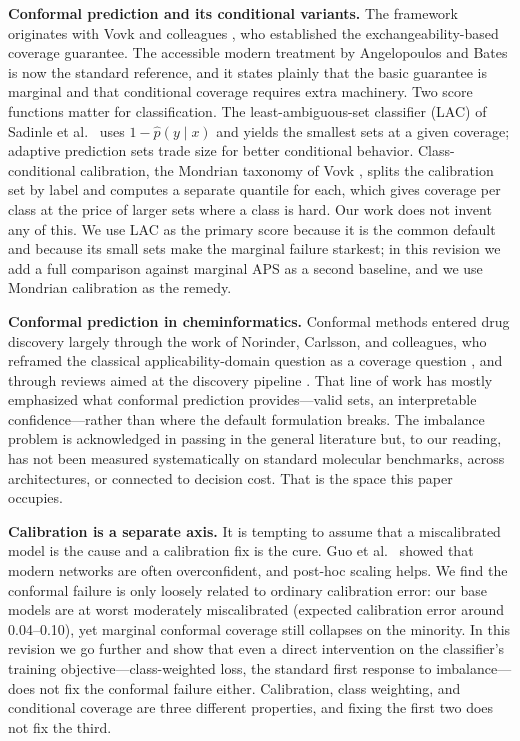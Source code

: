 \documentclass[11pt]{article}
\begin{document}
\textbf{Conformal prediction and its conditional variants.} The framework originates with Vovk and
colleagues \cite{vovk2005}, who established the exchangeability-based coverage guarantee. The
accessible modern treatment by Angelopoulos and Bates \cite{angelopoulos2023} is now the standard
reference, and it states plainly that the basic guarantee is marginal and that conditional
coverage requires extra machinery. Two score functions matter for classification. The
least-ambiguous-set classifier (LAC) of Sadinle et al.\ \cite{sadinle2019} uses $1-\hat p(y\mid x)$
and yields the smallest sets at a given coverage; adaptive prediction sets \cite{romano2020} trade
size for better conditional behavior. Class-conditional calibration, the Mondrian taxonomy of Vovk
\cite{vovk2013}, splits the calibration set by label and computes a separate quantile for each,
which gives coverage per class at the price of larger sets where a class is hard. Our work does not
invent any of this. We use LAC as the primary score because it is the common default and because
its small sets make the marginal failure starkest; in this revision we add a full comparison
against marginal APS \cite{romano2020} as a second baseline, and we use Mondrian calibration as the
remedy.

\textbf{Conformal prediction in cheminformatics.} Conformal methods entered drug discovery largely
through the work of Norinder, Carlsson, and colleagues, who reframed the classical
applicability-domain question as a coverage question \cite{norinder2014}, and through reviews
aimed at the discovery pipeline \cite{eklund2015}. That line of work has mostly emphasized what
conformal prediction provides---valid sets, an interpretable confidence---rather than where the
default formulation breaks. The imbalance problem is acknowledged in passing in the general
literature but, to our reading, has not been measured systematically on standard molecular
benchmarks, across architectures, or connected to decision cost. That is the space this paper
occupies.

\textbf{Calibration is a separate axis.} It is tempting to assume that a miscalibrated model is the
cause and a calibration fix is the cure. Guo et al.\ \cite{guo2017} showed that modern networks are
often overconfident, and post-hoc scaling helps. We find the conformal failure is only loosely
related to ordinary calibration error: our base models are at worst moderately miscalibrated
(expected calibration error around 0.04--0.10), yet marginal conformal coverage still collapses on
the minority. In this revision we go further and show that even a direct intervention on the
classifier's training objective---class-weighted loss, the standard first response to
imbalance---does not fix the conformal failure either. Calibration, class weighting, and
conditional coverage are three different properties, and fixing the first two does not fix the
third.
\end{document}
